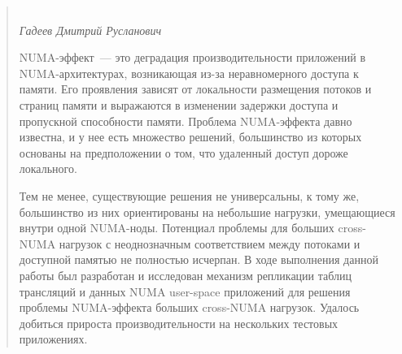 \begin{abstract}

    \begin{center}
        \large{} \\
    \large\textit{Гадеев Дмитрий Русланович} \\[1 cm]
    \end{center}

    NUMA-эффект~--- это деградация производительности приложений в NUMA-архитектурах, возникающая из-за неравномерного доступа к памяти. Его проявления зависят от локальности размещения потоков и страниц памяти и выражаются в изменении задержки доступа и пропускной способности памяти. Проблема NUMA-эффекта давно известна, и у нее есть множество решений, большинство из которых основаны на предположении о том, что удаленный доступ дороже локального.

    Тем не менее, существующие решения не универсальны, к тому же, большинство из них ориентированы на небольшие нагрузки, умещающиеся внутри одной NUMA-ноды. Потенциал проблемы для больших cross-NUMA нагрузок с неоднозначным соответствием между потоками и доступной памятью не полностью исчерпан. В ходе выполнения данной работы был разработан и исследован механизм репликации таблиц трансляций и данных NUMA user-space приложений для решения проблемы NUMA-эффекта больших cross-NUMA нагрузок. Удалось добиться прироста производительности на нескольких тестовых приложениях.




\end{abstract}
